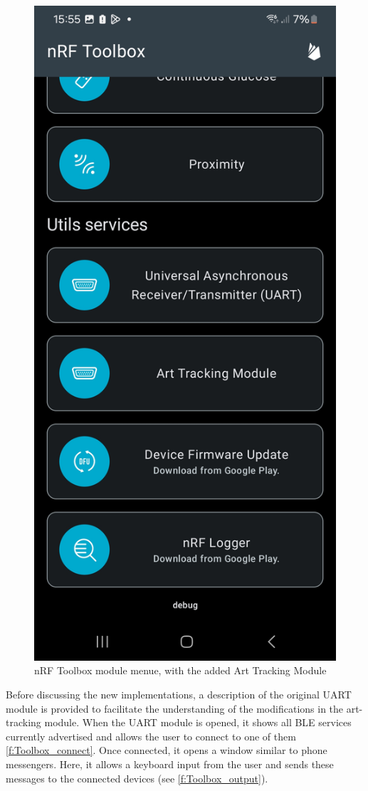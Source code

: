 \begin{figure}[ht!]
	\centering
	\includegraphics[trim={0 4cm 0 3cm},clip, width=.4\linewidth]{graphics/nRF_toolbox_modules.jpg}
	\caption{nRF Toolbox module menue, with the added Art Tracking Module}
	\label{f:Toolbox_modules}
\end{figure}

Before discussing the new implementations, a description of the original UART module is provided to facilitate the understanding of the modifications in the art-tracking module.
When the UART module is opened, it shows all BLE services currently advertised and allows the user to connect to one of them \ref{f:Toolbox_connect}.
Once connected, it opens a window similar to phone messengers.
Here, it allows a keyboard input from the user and sends these messages to the connected devices (see \ref{f:Toolbox_output}).


